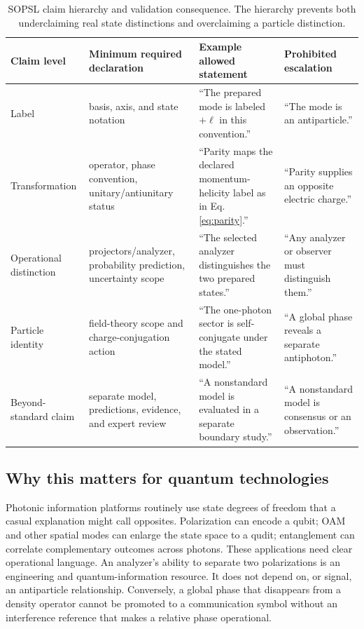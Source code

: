 \documentclass[conference]{../../../../Conference-LaTeX-template_10-17-19/IEEEtran}
\begin{document}
\begin{table}[!t]
\caption{SOPSL claim hierarchy and validation consequence. The hierarchy prevents both underclaiming real state distinctions and overclaiming a particle distinction.}
\label{tab:hierarchy}
\centering
\small
\begin{tabularx}{\textwidth}{lYYY}
\toprule
Claim level & Minimum required declaration & Example allowed statement & Prohibited escalation \\
\midrule
Label & basis, axis, and state notation & ``The prepared mode is labeled $+\ell$ in this convention.'' & ``The mode is an antiparticle.'' \\
Transformation & operator, phase convention, unitary/antiunitary status & ``Parity maps the declared momentum-helicity label as in Eq. \eqref{eq:parity}.'' & ``Parity supplies an opposite electric charge.'' \\
Operational distinction & projectors/analyzer, probability prediction, uncertainty scope & ``The selected analyzer distinguishes the two prepared states.'' & ``Any analyzer or observer must distinguish them.'' \\
Particle identity & field-theory scope and charge-conjugation action & ``The one-photon sector is self-conjugate under the stated model.'' & ``A global phase reveals a separate antiphoton.'' \\
Beyond-standard claim & separate model, predictions, evidence, and expert review & ``A nonstandard model is evaluated in a separate boundary study.'' & ``A nonstandard model is consensus or an observation.'' \\
\bottomrule
\end{tabularx}
\end{table}

\subsection{Why this matters for quantum technologies}
Photonic information platforms routinely use state degrees of freedom that a casual explanation might call opposites. Polarization can encode a qubit; OAM and other spatial modes can enlarge the state space to a qudit; entanglement can correlate complementary outcomes across photons. These applications need clear operational language. An analyzer’s ability to separate two polarizations is an engineering and quantum-information resource. It does not depend on, or signal, an antiparticle relationship. Conversely, a global phase that disappears from a density operator cannot be promoted to a communication symbol without an interference reference that makes a relative phase operational.
\end{document}
